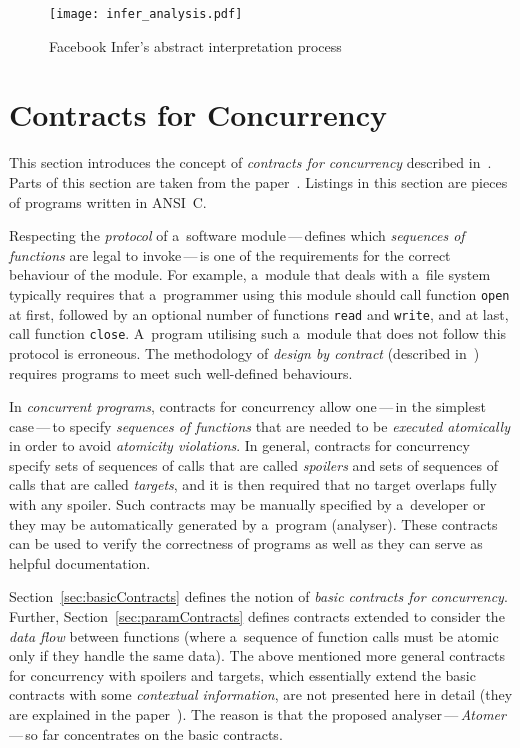 \begin{figure}[hbt]
    \centering
    \texttt{[image: infer\_analysis.pdf]}
    \caption{%
        Facebook Infer's abstract interpretation
        process~\cite{inferAISlides, projectPracticeMarcin2018}
    }
    \label{fig:inferAnalysis}
\end{figure}


\section{Contracts for Concurrency}
\label{sec:contracts}

This section introduces the concept of \emph{contracts for concurrency}
described in~\cite{contracts2015, contracts2017}. Parts of this section are
taken from the paper~\cite{excel2019FBInfer}. Listings in this section are
pieces of programs written in ANSI~C.

Respecting the \emph{protocol} of a~software module\,---\,defines
which \emph{sequences of functions} are legal to invoke\,---\,is one of the
requirements for the correct behaviour of the module. For example, a~module
that deals with a~file system typically requires that a~programmer using
this module should call function \texttt{open} at first, followed by an
optional number of functions \texttt{read} and \texttt{write}, and at last,
call function \texttt{close}. A~program utilising such a~module that does
not follow this protocol is erroneous. The methodology of \emph{design by
contract} (described in~\cite{contract}) requires programs to meet
such well-defined behaviours.~\cite{contracts2015}

In \emph{concurrent programs}, contracts for concurrency allow 
one\,---\,in the simplest case\,---\,to specify \emph{sequences of 
functions} that are needed to be \emph{executed atomically} in order to 
avoid \emph{atomicity violations}. In general, contracts for concurrency 
specify sets of sequences of calls that are called \emph{spoilers} and sets 
of sequences of calls that are called \emph{targets}, and it is then 
required that no target overlaps fully with any spoiler. Such contracts may 
be manually specified by a~developer or they may be automatically generated 
by a~program (analyser). These contracts can be used to verify the 
correctness of programs as well as they can serve as helpful documentation.

Section~\ref{sec:basicContracts} defines the notion of \emph{basic contracts
for concurrency}. Further, Section~\ref{sec:paramContracts} defines
contracts extended to consider the \emph{data flow} between functions 
(where a~sequence of function calls must be atomic only if they handle the
same data). The above mentioned more general contracts for concurrency with
spoilers and targets, which essentially extend the basic contracts with
some \emph{contextual information}, are not presented here in detail 
(they are explained in the paper~\cite{contracts2017}). The reason is that
the proposed analyser\,---\,\emph{Atomer}\,---\,so far concentrates on the 
basic contracts.


